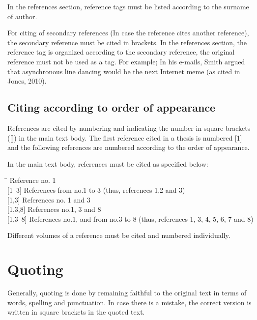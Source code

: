 In the references section, reference tags must be listed according to the surname of author. 

For citing of secondary references (In case the reference cites another reference), the secondary reference must be cited in brackets.  In the references section, the reference tag is organized according to the secondary reference, the original reference must not be used as a tag. For example; In his e-mails, Smith argued that asynchronous line dancing would be the next Internet meme (as cited in Jones, 2010).

\subsection{Citing according to order of appearance}

References are cited by numbering and indicating the number in square brackets ([]) in the main text body. The first reference cited in a thesis is numbered [1] and the following references are numbered according to the order of appearance. 

In the main text body, references must be cited as specified below:
\vspace*{-12pt}
\begin{tabbing}
\hspace*{1.5cm}\= \kill
[1]      \> Reference no. 1\\

[1--3]   \> References from no.1 to 3 (thus, references 1,2 and 3)\\

[1,3]    \> References no. 1 and 3\\

[1,3,8]  \> References no.1, 3 and 8\\

[1,3--8] \> References no.1, and from no.3 to 8 (thus, references 1, 3, 4, 5, 6, 7 and 8)
\end{tabbing}
\vspace*{-12pt}
Different volumes of a reference must be cited and numbered individually.

\section{Quoting}

Generally, quoting is done by remaining faithful to the original text in terms of words, spelling and punctuation. In case there is a mistake, the correct version is written in square brackets in the quoted text.

